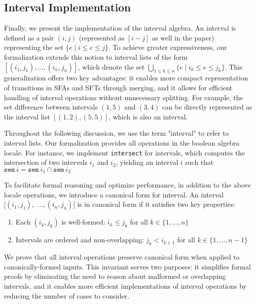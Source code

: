 \subsection{Interval Implementation}

Finally, we present the implementation of the interval algebra.
An interval is defined as a pair $(i, j)$ (represented as $[i-j]$ as well in the paper) representing the set $\{e \mid i \leq e \leq j\}$. To achieve greater expressiveness, our formalization extends this notion to interval lists of the form $[(i_1, j_1), \ldots, (i_n, j_n)]$, which denote the set $\bigcup_{1\leq k\leq n}\{e \mid i_k \leq e \leq j_k\}$. This generalization offers two key advantages: it enables more compact representation of transitions in SFAs and SFTs through merging, and it allows for efficient handling of interval operations without unnecessary splitting. For example, the set difference between intervals $(1, 5)$ and $(3, 4)$ can be directly represented as the interval list $[(1, 2), (5, 5)]$, which is also an interval.


Throughout the following discussion, we use the term "interval" to refer to interval lists. Our formalization provides all operations in the boolean algebra locale. For instance, we implement \texttt{intersect} for intervals, which computes the intersection of two intervals $i_1$ and $i_2$, yielding an interval $i$ such that $\texttt{sem}~i = \texttt{sem}~i_1 \cap \texttt{sem}~i_2$

To facilitate formal reasoning and optimize performance, in addition to the above locale operations, we introduce a canonical form for interval. An interval $[(i_1, j_1), $ $\ldots, (i_n, j_n)]$ is in canonical form if it satisfies two key properties:
\begin{enumerate}
  \item Each $(i_k, j_k)$ is well-formed: $i_k \leq j_k$ for all $k \in \{1,\ldots,n\}$
  \item Intervals are ordered and non-overlapping: $j_k < i_{k+1}$ for all $k \in \{1,\ldots,n-1\}$
\end{enumerate}

We prove that all interval operations preserve canonical form when applied to canonically-formed inputs. This invariant serves two purposes: it simplifies formal proofs by eliminating the need to reason about malformed or overlapping intervals, and it enables more efficient implementations of interval operations by reducing the number of cases to consider.
